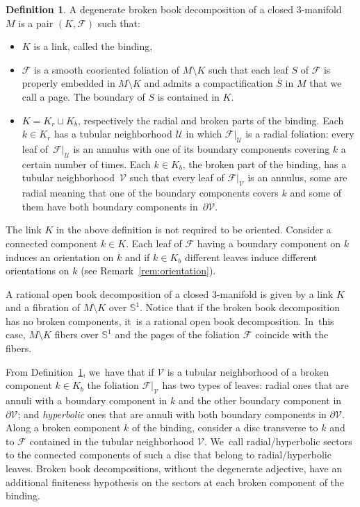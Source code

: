 \documentclass[10pt]{amsart}
\newcommand{\threemanifold}{$3$\nobreakdash-mani\-fold\xspace}
\theoremstyle{definition}
\newtheorem{defi}[theorem]{Definition}
\newcommand{\mS}{\mathbb{S}}
\begin{document}
\begin{defi}\label{defn:BBD}
A degenerate broken book decomposition of a closed \threemanifold~$M$ is a pair $(K,\mathcal{F})$ such that:
\begin{itemize}
\item
$K$ is a link, called the binding,
\item
$\mathcal{F}$ is a smooth cooriented foliation of $M\setminus K$ such that each leaf $S$ of $\mathcal{F}$ is properly embedded in $M\setminus K$ and admits a compactification $\overline{S}$ in $M$ that we call a page. The boundary of $S$ is contained in $K$.
\item
$K=K_r\sqcup K_b$, respectively the radial and broken parts of the binding. Each $k\in K_r$ has a tubular neighborhood $\mathcal{U}$ in which $\mathcal{F}|_{\mathcal U}$ is a radial foliation: every leaf of~$\mathcal{F}|_{\mathcal U}$ is an annulus with one of its boundary components covering $k$ a certain number of times. Each $k\in K_b$, the broken part of the binding, has a tubular neighborhood~$\mathcal{V}$ such that every leaf of $\mathcal{F}|_{\mathcal{V}}$ is an annulus, some are radial meaning that one of the boundary components covers $k$ and some of them have both boundary components in~$\partial \mathcal{V}$.
\end{itemize}
\end{defi}

The link $K$ in the above definition is not required to be oriented. Consider a connected component $k\in K$. Each leaf of $\mathcal{F}$ having a boundary component on $k$ induces an orientation on $k$ and if $k\in K_b$ different leaves induce different orientations on $k$ (see Remark~\ref{rem:orientation}).

A rational open book decomposition of a closed \threemanifold is given by a link $K$ and a fibration of $M\setminus K$ over $\mathbb{S}^1$. Notice that if the broken book decomposition has no broken components, it~is a rational open book decomposition. In~this case, $M\setminus K$ fibers over $\mS^1$ and the pages of the foliation $\mathcal{F}$ coincide with the fibers.

From Definition~\ref{defn:BBD}, we~have that if $\mathcal{V}$ is a tubular neighborhood of a broken component $k\in K_b$ the foliation $\mathcal{F}|_{\mathcal{V}}$ has two types of leaves: radial ones that are annuli with a boundary component in $k$ and the other boundary component in $\partial {\mathcal{V}}$; and \emph{hyperbolic} ones that are annuli with both boundary components in $\partial {\mathcal{V}}$.
Along a broken component $k$ of the binding, consider a disc transverse to $k$ and to $\mathcal{F}$ contained in the tubular neighborhood $\mathcal V$. We~call radial/hyperbolic sectors to the connected components of such a disc that belong to radial/hyperbolic leaves. Broken book decompositions, without the degenerate adjective, have an additional finiteness hypothesis on the sectors at each broken component of the binding.
\end{document}

